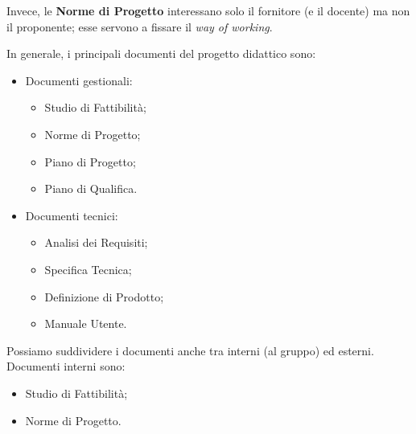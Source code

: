 \documentclass[a4paper]{article}
\begin{document}
		
Invece, le \textbf{Norme di Progetto} interessano solo il fornitore (e il docente) ma non il proponente; esse servono a fissare il \emph{way of working}.
		
In generale, i principali documenti del progetto didattico sono:
		
	\begin{itemize}
		
			
	\item Documenti gestionali:
				
	\begin{itemize}
		
					
	\item Studio di Fattibilità;
					
	\item Norme di Progetto;
					
	\item Piano di Progetto;
					
	\item Piano di Qualifica.
				
	\end{itemize}

			
			
	\item Documenti tecnici:
				
	\begin{itemize}
		
					
	\item Analisi dei Requisiti;
					
	\item Specifica Tecnica;
					
	\item Definizione di Prodotto;
					
	\item Manuale Utente.
				
	\end{itemize}

			
		
	\end{itemize}

		
Possiamo suddividere i documenti anche tra interni (al gruppo) ed esterni. Documenti interni sono:
		
	\begin{itemize}
		
			
	\item Studio di Fattibilità;
			
	\item Norme di Progetto.
		
	\end{itemize}
\end{document}

